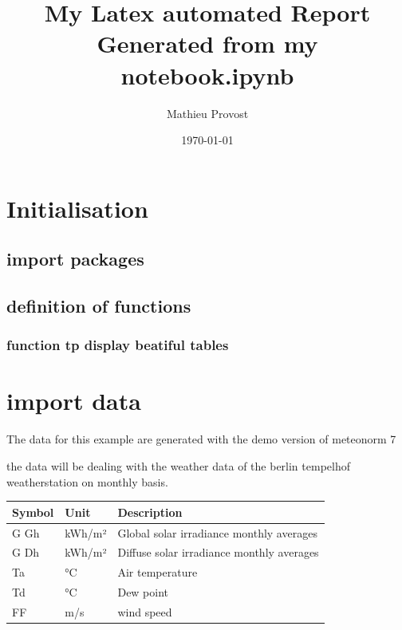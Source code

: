 \documentclass[reprint, floatfix, groupaddress, prb]{article}
\title{\huge{\textbf{My Latex automated Report}}\\[2ex]  \LARGE{Generated from my notebook.ipynb}}
\author{Mathieu Provost}
\date{\today}
\newcommand{\prompt}[4]{
        \ttfamily\llap{{\color{#2}[#3]:\hspace{3pt}#4}}\vspace{-\baselineskip}
    }
\begin{document}
    
    
    
\maketitle

\newpage

\tableofcontents

\newpage

    
    

    
    \hypertarget{initialisation}{%
\section{Initialisation}\label{initialisation}}

    \hypertarget{import-packages}{%
\subsection{import packages}\label{import-packages}}

    \hypertarget{definition-of-functions}{%
\subsection{definition of functions}\label{definition-of-functions}}

    \hypertarget{function-tp-display-beatiful-tables}{%
\subsubsection{function tp display beatiful
tables}\label{function-tp-display-beatiful-tables}}

    \hypertarget{import-data}{%
\section{import data}\label{import-data}}

    The data for this example are generated with the demo version of
meteonorm 7

the data will be dealing with the weather data of the berlin tempelhof
weatherstation on monthly basis.
 
            
\prompt{Out}{outcolor}{4}{}
    
    \begin{table}[ht] 
\begin{tabular}[l]{lll}
\toprule
Symbol & Unit & Description\\ 
\midrule
G Gh & kWh/m² & Global solar irradiance monthly averages\\ 
G Dh & kWh/m² & Diffuse solar irradiance monthly averages\\ 
Ta & °C & Air temperature\\ 
Td & °C & Dew point\\ 
FF & m/s & wind speed\\ 
\bottomrule 
 \end{tabular}
\end{table}
\end{document}
